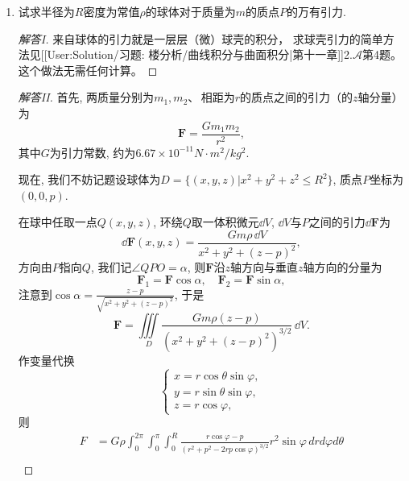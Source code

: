 \begin{quizb}
\begin{enumerate}
\item 试求半径为\(R\)密度为常值\(\rho\)的球体对于质量为\(m\)的质点\(P\)的万有引力.
\begin{proof}[解答I]
来自球体的引力就是一层层（微）球壳的积分，
求球壳引力的简单方法见[[User:Solution/\qquad 习题: 楼分析/曲线积分与曲面积分|第十一章]]2.$\mathcal{A}$第4题。
这个做法无需任何计算。
\end{proof}
\begin{proof}[解答II]
首先, 两质量分别为\(m_1,m_2\)、\,相距为\(r\)的质点之间的引力（的$z$轴分量）为
\[\boldsymbol{F}=\frac{Gm_1m_2}{r^2},\]其中\(G\)为引力常数, 
约为\(6.67\times 10^{-11}N\cdot m^2/kg^2\).

现在, 我们不妨记题设球体为\(D=\{(x,y,z)\big| x^2+y^2+z^2\leqslant R^2\}\), 质点\(P\)坐标为\((0,0,p)\).
在球中任取一点\(Q(x,y,z)\), 环绕\(Q\)取一体积微元\(\dd V\), 
\(\dd V\)与\(P\)之间的引力\(\dd\boldsymbol{F}\)为
\[\dd \boldsymbol{F}(x,y,z)=\frac{Gm\rho\,\dd V}{x^2+y^2+(z-p)^2},\]
方向由\(P\)指向\(Q\), 我们记\(\angle QPO=\alpha\), 
则\(\boldsymbol{F}\)沿\(z\)轴方向与垂直\(z\)轴方向的分量为
\[\boldsymbol{F}_1=\boldsymbol{F}\cos\alpha,\quad 
\boldsymbol{F}_2=\boldsymbol{F}\sin\alpha,\]
注意到\(\cos\alpha=\frac{z-p}{\sqrt{x^2+y^2+(z-p)^2}}\), 于是
\[\boldsymbol{F}=\iiint\limits_{D}\frac{Gm\rho(z-p)}{(x^2+y^2+(z-p)^2)^{3/2}}\,\dd V.\]
作变量代换
\[\begin{cases}x=r\cos\theta\sin\varphi,\\y=r\sin\theta\sin\varphi,\\z=r\cos\varphi,\end{cases}\]
则\begin{align*}
    F&=G\rho\int_0^{2\pi}\int_0^\pi\int_0^R\frac{r\cos\varphi-p}{(r^2+p^2-2rp\cos\varphi)^{3/2}}r^2\sin\varphi\,drd\varphi d\theta\\

\end{align*}
\end{proof}
\end{enumerate}
\end{quizb}
